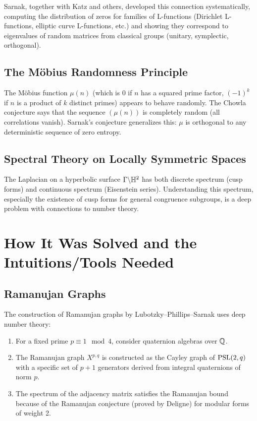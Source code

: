 Sarnak, together with Katz and others, developed this connection systematically, computing the distribution of zeros for families of L-functions (Dirichlet L-functions, elliptic curve L-functions, etc.) and showing they correspond to eigenvalues of random matrices from classical groups (unitary, symplectic, orthogonal).

\subsection{The M\"obius Randomness Principle}

The M\"obius function $\mu(n)$ (which is $0$ if $n$ has a squared prime factor, $(-1)^k$ if $n$ is a product of $k$ distinct primes) appears to behave randomly. The Chowla conjecture says that the sequence $(\mu(n))$ is completely random (all correlations vanish). Sarnak's conjecture generalizes this: $\mu$ is orthogonal to any deterministic sequence of zero entropy.

\subsection{Spectral Theory on Locally Symmetric Spaces}

The Laplacian on a hyperbolic surface $\Gamma \backslash \mathbb{H}^2$ has both discrete spectrum (cusp forms) and continuous spectrum (Eisenstein series). Understanding this spectrum, especially the existence of cusp forms for general congruence subgroups, is a deep problem with connections to number theory.

\section{How It Was Solved and the Intuitions/Tools Needed}

\subsection{Ramanujan Graphs}

The construction of Ramanujan graphs by Lubotzky--Phillips--Sarnak uses deep number theory:
\begin{enumerate}
    \item For a fixed prime $p \equiv 1 \mod 4$, consider quaternion algebras over $\mathbb{Q}$.
    \item The Ramanujan graph $X^{p,q}$ is constructed as the Cayley graph of $\operatorname{PSL}(2,q)$ with a specific set of $p+1$ generators derived from integral quaternions of norm $p$.
    \item The spectrum of the adjacency matrix satisfies the Ramanujan bound because of the Ramanujan conjecture (proved by Deligne) for modular forms of weight 2.
\end{enumerate}

